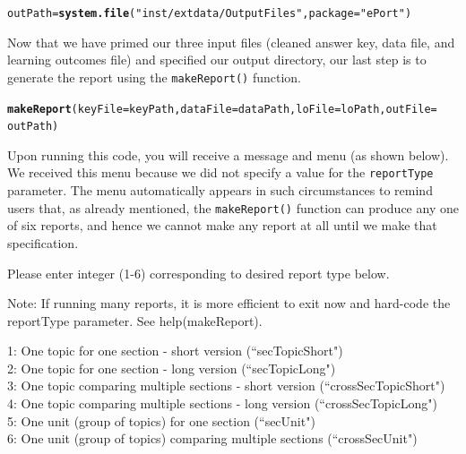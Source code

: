 \documentclass{article}\usepackage[]{graphicx}\usepackage[]{color}
\makeatletter
\newcommand{\hlstr}[1]{\textcolor[rgb]{0.192,0.494,0.8}{#1}}%
\newcommand{\hlstd}[1]{\textcolor[rgb]{0.345,0.345,0.345}{#1}}%
\newcommand{\hlkwb}[1]{\textcolor[rgb]{0.69,0.353,0.396}{#1}}%
\newcommand{\hlkwc}[1]{\textcolor[rgb]{0.333,0.667,0.333}{#1}}%
\newcommand{\hlkwd}[1]{\textcolor[rgb]{0.737,0.353,0.396}{\textbf{#1}}}%
\newenvironment{kframe}{%
 \def\at@end@of@kframe{}%
 \ifinner\ifhmode%
  \def\at@end@of@kframe{\end{minipage}}%
  \begin{minipage}{\columnwidth}%
 \fi\fi%
 \def\FrameCommand##1{\hskip\@totalleftmargin \hskip-\fboxsep
 \colorbox{shadecolor}{##1}\hskip-\fboxsep
     \hskip-\linewidth \hskip-\@totalleftmargin \hskip\columnwidth}%
 \MakeFramed {\advance\hsize-\width
   \@totalleftmargin\z@ \linewidth\hsize
   \@setminipage}}%
 {\par\unskip\endMakeFramed%
 \at@end@of@kframe}
\newenvironment{knitrout}{}{} %
\numberwithin{equation}{section} %
\makeatother
\begin{document}
\begin{knitrout}
\color{fgcolor}\begin{kframe}
\begin{alltt}
\hlstd{outPath} \hlkwb{=} \hlkwd{system.file}\hlstd{(}\hlstr{"inst/extdata/OutputFiles"}\hlstd{,} \hlkwc{package} \hlstd{=} \hlstr{"ePort"}\hlstd{)}
\end{alltt}
\end{kframe}
\end{knitrout}

Now that we have primed our three input files (cleaned answer key, data file, and learning outcomes file) and specified our output directory, our last step is to generate the report using the \texttt{makeReport()} function. \\

\begin{knitrout}
\color{fgcolor}\begin{kframe}
\begin{alltt}
\hlkwd{makeReport}\hlstd{(}\hlkwc{keyFile} \hlstd{= keyPath,} \hlkwc{dataFile} \hlstd{= dataPath,} \hlkwc{loFile} \hlstd{= loPath,} \hlkwc{outFile} \hlstd{=}
  \hlstd{outPath)}
\end{alltt}
\end{kframe}
\end{knitrout}

Upon running this code, you will receive a message and menu (as shown below). We received this menu because we did not specify a value for the \texttt{reportType} parameter. The menu automatically appears in such circumstances to remind users that, as already mentioned, the \texttt{makeReport()} function can produce any one of six reports, and hence we cannot make any report at all until we make that specification.

\begin{framed}
\vspace{2mm}
Please enter integer (1-6) corresponding to desired report type below.

Note: If running many reports, it is more efficient to exit now and hard-code the reportType parameter. See help(makeReport).

1: One topic for one section - short version (``secTopicShort")\\
2: One topic for one section - long version (``secTopicLong")\\
3: One topic comparing multiple sections - short version (``crossSecTopicShort")\\
4: One topic comparing multiple sections - long version (``crossSecTopicLong")\\
5: One unit (group of topics) for one section (``secUnit")\\
6: One unit (group of topics) comparing multiple sections (``crossSecUnit")
\end{framed}
\end{document}
